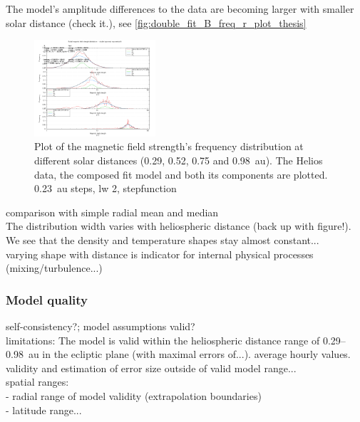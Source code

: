 The model's amplitude differences to the data are becoming larger with smaller solar distance (check it.), see \autoref{fig:double_fit_B_freq_r_plot_thesis}\\
\begin{figure}[htb]
	\centering
	\includegraphics[width=0.4\textwidth]{images/gnuplots/double_fit_B_freq_r_plot_thesis.png}
	\caption{Plot of the magnetic field strength's frequency distribution at different solar distances (0.29, 0.52, 0.75 and 0.98~au). The Helios data, the composed fit model and both its components are plotted. 0.23~au steps, lw 2, stepfunction}
	\label{fig:double_fit_B_freq_r_plot_thesis}
\end{figure}

comparison with simple radial mean and median\\

The distribution width varies with heliospheric distance (back up with figure!).\\

We see that the density and temperature shapes stay almost constant...\\

varying shape with distance is indicator for internal physical processes (mixing/turbulence...)\\

\subsubsection{Model quality}
self-consistency?; model assumptions valid?\\

limitations: The model is valid within the heliospheric distance range of 0.29--0.98~au in the ecliptic plane (with maximal errors of...). average hourly values.\\

validity and estimation of error size outside of valid model range...\\
spatial ranges:\\
- radial range of model validity (extrapolation boundaries)\\
- latitude range...\\

